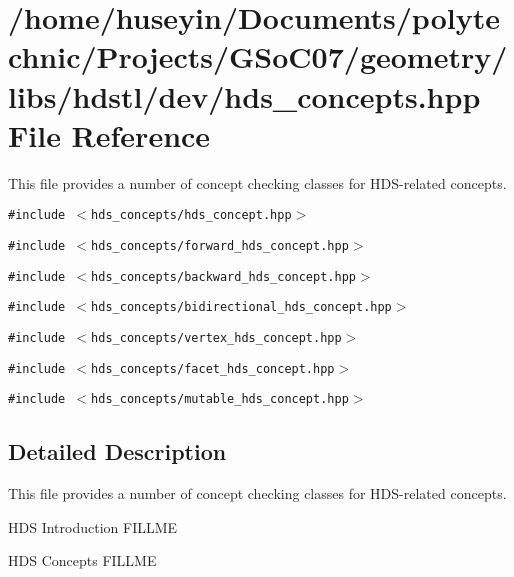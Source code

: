 \section{/home/huseyin/Documents/polytechnic/Projects/GSo\-C07/geometry/libs/hdstl/dev/hds\_\-concepts.hpp File Reference}
\label{hds__concepts_8hpp}
This file provides a number of concept checking classes for HDS-related concepts. 

{\tt \#include $<$hds\_\-concepts/hds\_\-concept.hpp$>$}\par
{\tt \#include $<$hds\_\-concepts/forward\_\-hds\_\-concept.hpp$>$}\par
{\tt \#include $<$hds\_\-concepts/backward\_\-hds\_\-concept.hpp$>$}\par
{\tt \#include $<$hds\_\-concepts/bidirectional\_\-hds\_\-concept.hpp$>$}\par
{\tt \#include $<$hds\_\-concepts/vertex\_\-hds\_\-concept.hpp$>$}\par
{\tt \#include $<$hds\_\-concepts/facet\_\-hds\_\-concept.hpp$>$}\par
{\tt \#include $<$hds\_\-concepts/mutable\_\-hds\_\-concept.hpp$>$}\par


\subsection{Detailed Description}
This file provides a number of concept checking classes for HDS-related concepts. 

\begin{Desc}
\item[HDS Introduction]FILLME\end{Desc}
\begin{Desc}
\item[HDS Concepts]FILLME \end{Desc}
